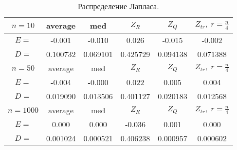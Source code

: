 \documentclass[a4]{article}
\begin{document}
		\begin{table}[h]
			\caption{ Распределение Лапласа.}
			\begin{center}
				\begin{tabular}{|c|c|c|c|c|c|}
					\hline
					$n = 10$    & average & med & $Z_R$ & $Z_Q$ & $Z_{tr},\;r=\frac{n}{4}$\\ \hline 
					$E = $    &  	-0.001    &    -0.010 &       0.026      &   -0.015      &  -0.002   \\ \hline
					$D = $     & 0.100732      &   0.069101        & 0.425729      &   0.094138       &  0.071388    \\ \hline
					
					$n = 50$  & average & med & $Z_R$ & $Z_Q$ & $Z_{tr},\;r=\frac{n}{4}$\\ \hline
					$E = $     & -0.004       & -0.000       & 0.022 &         0.005 &         0.004   \\ \hline
					$D =$      & 	0.019090    &     0.013506  &       0.401127      &   0.020183      &   0.012568  \\ \hline
					
					$n = 1000$   & average & med & $Z_R$ & $Z_Q$ & $Z_{tr},\;r=\frac{n}{4}$\\ \hline
					$E =$      & 	0.000    &     0.000  &       -0.036     &   0.001     &    0.000     \\ \hline
					$D = $     & 0.001024        & 0.000521       &  0.406238      &   0.000957       &  0.000602 \\ 
					\hline
				\end{tabular}
			\end{center}
		\end{table}
		
\end{document}
